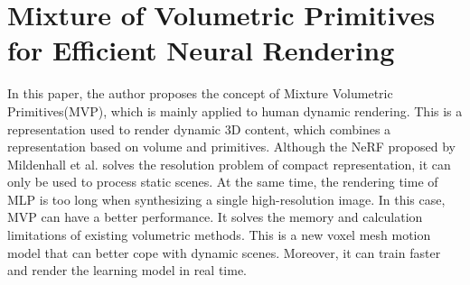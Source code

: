 \documentclass[UTF-8]{ctexart}
\begin{document}
\section{Mixture of Volumetric Primitives for Efficient Neural Rendering}
In this paper, the author proposes the concept of Mixture Volumetric Primitives(MVP), which is mainly applied to human dynamic rendering. This is a representation used to render dynamic 3D content, which combines a representation based on volume and primitives. Although the NeRF proposed by Mildenhall et al. solves the resolution problem of compact representation, it can only be used to process static scenes. At the same time, the rendering time of MLP is too long when synthesizing a single high-resolution image. In this case, MVP can have a better performance. It solves the memory and calculation limitations of existing volumetric methods. This is a new voxel mesh motion model that can better cope with dynamic scenes. Moreover, it can train faster and render the learning model in real time.
\end{document}
